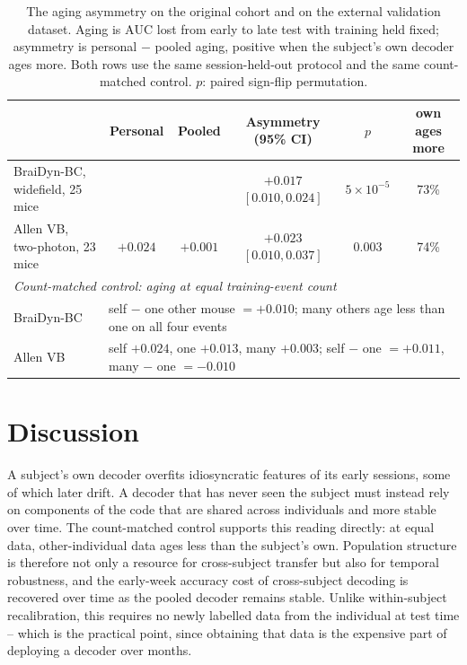 \documentclass{article}
\newcommand{\auc}{\mathrm{AUC}}
\begin{document}
\begin{table}[t]\centering
\caption{The aging asymmetry on the original cohort and on the external validation dataset. Aging
is $\auc$ lost from early to late test with training held fixed; asymmetry is personal $-$ pooled
aging, positive when the subject's own decoder ages more. Both rows use the same session-held-out
protocol and the same count-matched control. $p$: paired sign-flip permutation.}
\label{tab:allen}
\setlength{\tabcolsep}{5pt}
\begin{tabular}{lccccc}
\toprule
& Personal & Pooled & Asymmetry (95\% CI) & $p$ & own ages more \\
\midrule
BraiDyn-BC, widefield, 25 mice & & & $+0.017$ $[0.010, 0.024]$ & $5\times10^{-5}$ & 73\% \\
Allen VB, two-photon, 23 mice & $+0.024$ & $+0.001$ & $+0.023$ $[0.010, 0.037]$ & 0.003 & 74\% \\
\midrule
\multicolumn{6}{l}{\emph{Count-matched control: aging at equal training-event count}} \\
BraiDyn-BC & \multicolumn{5}{l}{self $-$ one other mouse $= +0.010$; many others age less than one on all four events} \\
Allen VB & \multicolumn{5}{l}{self $+0.024$, one $+0.013$, many $+0.003$; self $-$ one $= +0.011$, many $-$ one $= -0.010$} \\
\bottomrule
\end{tabular}
\end{table}

\section{Discussion}
A subject's own decoder overfits idiosyncratic features of its early sessions, some of which later
drift. A decoder that has never seen the subject must instead rely on components of the code that are
shared across individuals and more stable over time. The count-matched control supports this reading
directly: at equal data, other-individual data ages less than the subject's own. Population structure
is therefore not only a resource for cross-subject transfer but also for temporal robustness, and the
early-week accuracy cost of cross-subject decoding is recovered over time as the pooled decoder
remains stable. Unlike within-subject recalibration, this requires no newly labelled data from the
individual at test time -- which is the practical point, since obtaining that data is the expensive
part of deploying a decoder over months.
\end{document}
